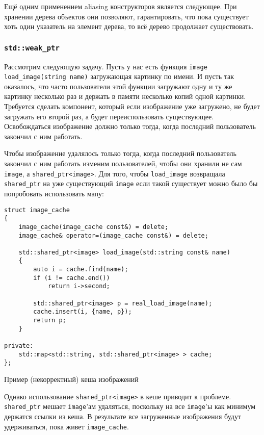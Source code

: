 Ещё одним применением aliasing конструкторов является следующее. При хранении дерева объектов они позволяют, гарантировать, что пока существует хоть один указатель на элемент дерева, то всё дерево продолжает существовать.

\subsubsection{\texttt{std::weak_ptr}}

Рассмотрим следующую задачу. Пусть у нас есть функция \texttt{image load_image(string name)} загружающая картинку по имени. И пусть так оказалось, что часто пользователи этой функции загружают одну и ту же картинку несколько раз и держать в памяти несколько копий одной картинки. Требуется сделать компонент, который если изображение уже загружено, не будет загружать его второй раз, а будет переиспользовать существующее. Освобождаться изображение должно только тогда, когда последний пользователь закончил с ним работать.

Чтобы изображение удалялось только тогда, когда последний пользователь закончил с ним работать изменим пользователей, чтобы они хранили не сам \texttt{image}, а \texttt{shared_ptr<image>}. Для того, чтобы \texttt{load_image} возвращала \texttt{shared_ptr} на уже существующий \texttt{image} если такой существует можно было бы попробовать использовать мапу:

\begin{listing}
\begin{verbatim}
struct image_cache
{
    image_cache(image_cache const&) = delete;
    image_cache& operator=(image_cache const&) = delete;

    std::shared_ptr<image> load_image(std::string const& name)
    {
        auto i = cache.find(name);
        if (i != cache.end())
            return i->second;

        std::shared_ptr<image> p = real_load_image(name);
        cache.insert(i, {name, p});
        return p;
    }

private:
    std::map<std::string, std::shared_ptr<image> > cache;
};
\end{verbatim}
\caption{Пример (некорректный) кеша изображений}
\label{listing:shared_ptr_image_cache_broken}
\end{listing}

Однако использование \texttt{shared_ptr<image>} в кеше приводит к проблеме. \texttt{shared_ptr} мешает \texttt{image}'ам удаляться, поскольку на все \texttt{image}'ы как минимум держатся ссылки из кеша. В результате все загруженные изображения будут удерживаться, пока живет \texttt{image_cache}.

